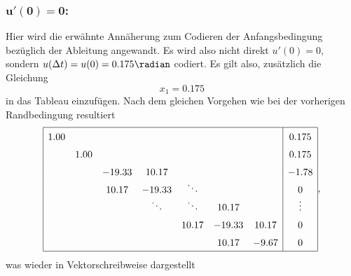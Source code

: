 \subsubsection{$\mathbf{u'(0) = 0 }$:}
Hier wird die erwähnte Annäherung zum Codieren der Anfangsbedingung bezüglich der Ableitung angewandt.
Es wird also nicht direkt $u'(0) = 0 $, sondern $u(\Delta t) = u(0) = 0.175 \radian$ codiert.
Es gilt also, zusätzlich die Gleichung
\begin{equation}
    x_1 = 0.175
\end{equation}
in das Tableau einzufügen.
Nach dem gleichen Vorgehen wie bei der vorherigen Randbedingung resultiert
\begin{equation}
    \def\arraystretch{1.5}
    \begin{array}{|ccccccc|c|}
        \hline
         1.00  &        &        &                &                &        &        & 0.175          \\
               &  1.00  &        &                &                &        &        & 0.175          \\
               &        &-19.33  & 10.17          &                &        &        & -1.78          \\
               &        & 10.17  &-19.33          & \smash{\ddots} &        &        & 0              \\
               &        &        & \smash{\ddots} & \smash{\ddots} & 10.17  &        & \smash{\vdots} \\
               &        &        &                & 10.17          &-19.33  & 10.17  & 0              \\
               &        &        &                &                & 10.17  & -9.67  & 0              \\
        \hline
    \end{array},
\end{equation}
was wieder in Vektorschreibweise dargestellt
